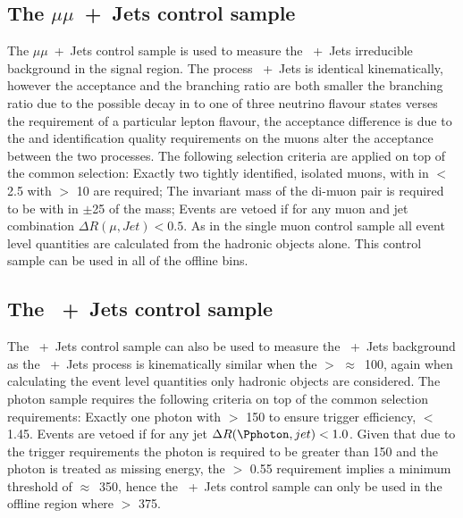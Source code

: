 \subsection{The $\mu\mu$~+~Jets control sample} %
\label{par:the_mumu_jets_control_sample}
The $\mu\mu$~+~Jets control sample is used to measure the 
\HepProcess{\PZ\to\nu\nu}~+~Jets irreducible background in the signal region. 
The process \HepProcess{\PZ\to\mu\mu}~+~Jets is identical kinematically, 
however the acceptance and the branching ratio are both smaller the branching 
ratio due to the possible decay in to one of three neutrino flavour states 
verses the requirement of a particular lepton flavour, the acceptance 
difference is due to the \PT and identification quality requirements on the 
muons alter the acceptance between the two processes. The following selection 
criteria are applied on top of the common selection: Exactly two tightly 
identified, isolated muons, with in \mETA $<$ 2.5 with \PT $>$ \unit{10}{\GeV} 
are required; The invariant mass of the di-muon pair is required to be with in 
$\pm$\unit{25}{\GeV} of the \PZ mass; Events are vetoed if for any muon and jet 
combination $\Delta R(\mu,Jet) < 0.5$. As in the single muon control sample all 
event level quantities are calculated from the hadronic objects alone. This 
control sample can be used in all of the offline \HT bins.

\subsection{The \Pphoton~+~Jets control sample} %
\label{par:the_pphoton_jets_control_sample}
The \Pphoton~+~Jets control sample can also be used to measure the 
\HepProcess{\PZ\to\nu\nu}~+~Jets background as the \Pphoton~+~Jets process is 
kinematically similar when the \Pphoton \ET $>$ 
$\approx$~\unit{100}{\GeV}\cite{PAS-SUS-08-002,Bern:2011pa}, again when 
calculating the event level quantities only hadronic objects are considered.
The photon sample requires the following criteria on top of the common 
selection requirements: Exactly one photon with \ET $>$ \unit{150}{\GeV} to 
ensure trigger efficiency, \mETA $<$ 1.45. Events are vetoed if for any jet 
$\Delta R(\Pphoton,jet) < 1.0$. Given that due to the trigger requirements the 
photon \ET is required to be greater than \unit{150}{\GeV} and the photon is 
treated as missing energy, the \alt $>$ 0.55 requirement implies a minimum \HT 
threshold of $\approx$~\unit{350}{\GeV}, hence the \Pphoton~+~Jets control 
sample can only be used in the offline region where \HT $>$ \unit{375}{\GeV}.

